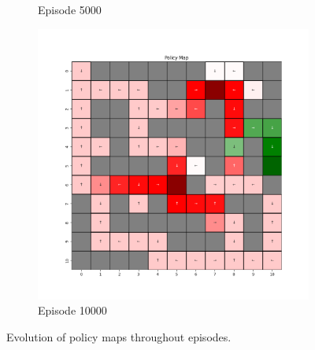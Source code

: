 \documentclass{assignment}
\begin{document}
\begin{figure}[H]
\begin{subfigure}{0.3\textwidth}
    \caption{Episode 5000}
    \end{subfigure}\hfill
    \begin{subfigure}{0.3\textwidth}
        \includegraphics[width=\textwidth]{figures/policy_td/alpha_sweep/policy_alpha_1_gamma_0.95_epsilon_0.2_iteration_10000.png}
    \caption{Episode 10000}
    \end{subfigure}
    \caption{Evolution of policy maps throughout episodes.}
    \label{fig:alpha_1_td_learning_policy}
\end{figure}
\end{document}
